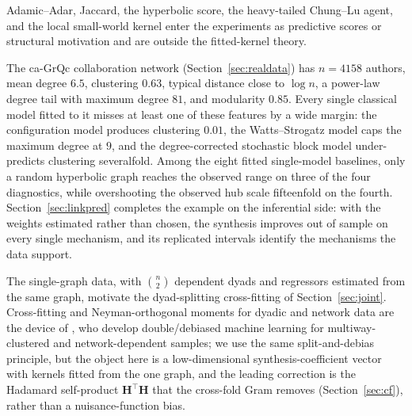 \documentclass[12pt]{article}
\newcommand{\1}{\mathbf{1}}
\begin{document}
Adamic--Adar, Jaccard, the hyperbolic score, the heavy-tailed Chung--Lu agent, and
the local small-world kernel enter the experiments as predictive scores or structural motivation and
are outside the fitted-kernel theory.

\label{sec:example}
The \textsf{ca-GrQc} collaboration network (Section~\ref{sec:realdata}) has $n=4158$ authors, mean
degree $6.5$, clustering $0.63$, typical distance close to $\log n$, a power-law degree tail with
maximum degree $81$, and modularity $0.85$. Every single classical model fitted to it misses at
least one of these features by a wide margin: the configuration model produces clustering $0.01$,
the Watts--Strogatz model caps the maximum degree at $9$, and the degree-corrected stochastic block
model under-predicts clustering severalfold. Among the eight fitted
single-model baselines, only a random hyperbolic graph reaches the observed range on three of the four diagnostics, while
overshooting the observed hub scale fifteenfold on the fourth. Section~\ref{sec:linkpred} completes the example on the inferential side: with the weights estimated
rather than chosen, the synthesis improves out of sample on every single mechanism, and its replicated
intervals identify the mechanisms the data support.
\label{sec:related}


The single-graph data, with $\binom n2$ dependent dyads and regressors estimated from the same graph,
motivate the dyad-splitting cross-fitting of Section~\ref{sec:joint}. Cross-fitting and
Neyman-orthogonal moments for dyadic and network data are the device of \citet{chiang2026double}, who
develop double/debiased machine learning for multiway-clustered and network-dependent samples; we use
the same split-and-debias principle, but the object here is a low-dimensional synthesis-coefficient
vector with kernels fitted from the one graph, and the leading correction is the Hadamard
self-product $\mathbf H^\top\mathbf H$ that the cross-fold Gram removes (Section~\ref{sec:cf}), rather than a nuisance-function bias.
\end{document}
